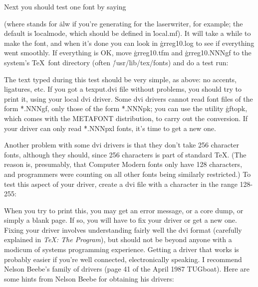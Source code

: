 Next you should test one font by saying

\smallskip
{}
\smallskip

(where  stands for \.{alw} if you're generating
for the laserwriter, for example; the default is
\.{localmode}, which should be defined in \.{local.mf}).
It will take a while to make the font, and when
it's done you can look in \.{grreg10.log} to see if everything went
smoothly.  If everything is OK, move \.{grreg10.tfm}
and \.{grreg10.NNNgf} to the system's \TeX\ font directory (often
\.{/usr/lib/tex/fonts}) and do a test run:

\smallskip
{}
\disp{\%}
\smallskip

The text typed during this test should be very simple, as above:
no accents, ligatures, etc.  If you got a \.{texput.dvi} file without
problems, you should try to print it, using your local dvi driver.
Some dvi drivers cannot read font files of the form \.{*.NNNgf},
only those of the form \.{*.NNNpk}; you can use the utility
\.{gftopk}, which comes with the METAFONT distribution, to carry
out the conversion.  If your driver can only read \.{*.NNNpxl} fonts,
it's time to get a new one.

Another problem with some dvi drivers is that they don't
take 256 character fonts, although they should, since 256 characters
is part of standard \TeX.  (The reason is, presumably, that Computer
Modern fonts only have 128 characters, and programmers were counting
on all other fonts being similarly restricted.)  To test this
aspect of your driver, create a dvi file with a character in the
range 128-255:

\smallskip
{}
\disp{\%}
\smallskip

When you try to print this, you may get an error message, or
a core dump, or simply a blank page.  If so, you will have to
fix your driver or get a new one.  Fixing your driver involves
understanding fairly well the dvi format (carefully explained
in {\it\TeX: The Program}), but should not be beyond anyone with
a modicum of systems programming experience.  Getting a driver
that works is probably easier if you're well connected,
electronically speaking.  I recommend Nelson Beebe's family
of drivers (page 41 of the April 1987 TUGboat).  Here are
some hints from Nelson Beebe for obtaining his drivers: 

